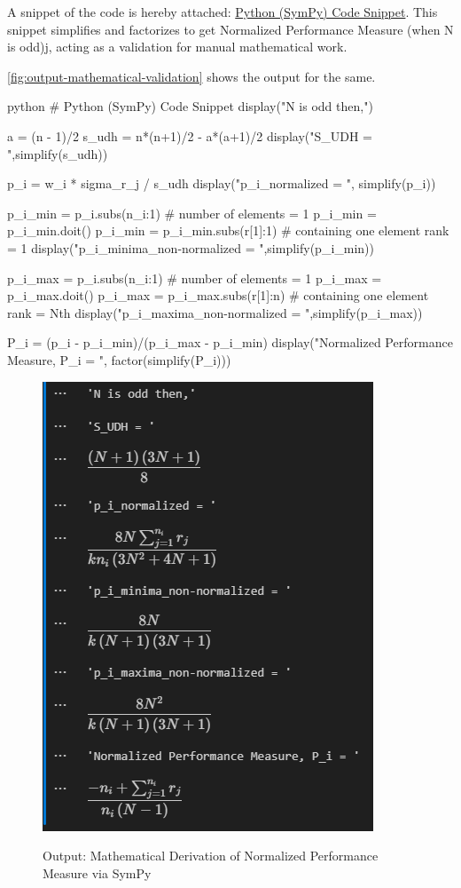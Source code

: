 \documentclass[a4paper,fleqn,review]{cas-sc}
\begin{document}
A snippet of the code is hereby attached: \hyperref[code:snippet_odd_performance_measure]{Python (SymPy) Code Snippet}. This snippet simplifies and factorizes to get Normalized Performance Measure (when N is odd)j, acting as a validation for manual mathematical work.

\autoref{fig:output-mathematical-validation} shows the output for the same.
 	
\begin{mintedbox}{python}
	# Python (SymPy) Code Snippet
	display("N is odd then,")
	
	a = (n - 1)/2
	s_udh = n*(n+1)/2 - a*(a+1)/2
	display("S_UDH = ",simplify(s_udh))
	
	p_i = w_i * sigma_r_j / s_udh
	display("p_i_normalized = ", simplify(p_i))
	
	p_i_min = p_i.subs({n_i:1}) # number of elements = 1
	p_i_min = p_i_min.doit()
	p_i_min = p_i_min.subs({r[1]:1}) # containing one element rank = 1
	display("p_i_minima_non-normalized = ",simplify(p_i_min))
	
	p_i_max = p_i.subs({n_i:1}) # number of elements = 1
	p_i_max = p_i_max.doit()
	p_i_max = p_i_max.subs({r[1]:n}) # containing one element rank = Nth
	display("p_i_maxima_non-normalized = ",simplify(p_i_max))
	
	P_i = (p_i - p_i_min)/(p_i_max - p_i_min)
	display("Normalized Performance Measure, P_i = ", factor(simplify(P_i)))
\end{mintedbox}
\label{code:snippet_odd_performance_measure}


\begin{figure}
	\caption{Output: Mathematical Derivation of Normalized Performance Measure via SymPy}
	\centering
	\includegraphics [scale=0.75]{output-mathematical-validation.png}
	\label{fig:output-mathematical-validation}
\end{figure}
\end{document}

